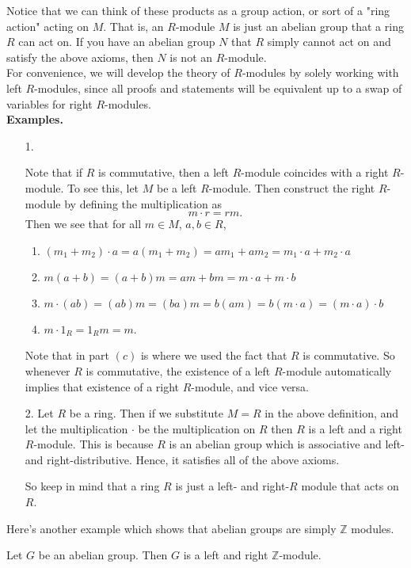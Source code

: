 \documentclass[12pt,letterpaper]{algebra_book}
\newcommand{\ZZ}{\mathbb{Z}}
\theoremstyle{definition}
\begin{document}
Notice that we can think of these products as a group action, or sort of a
"ring action" acting on $M$. That is, an $R$-module $M$ is just an abelian
group that a ring $R$ can act on. If you have an abelian group $N$
that $R$ simply cannot act on and satisfy the above axioms, then
$N$ is not an $R$-module.
\\
For convenience, we will develop the theory of $R$-modules by
solely working with left $R$-modules, since all proofs and
statements will be equivalent up to a swap of variables for right
$R$-modules. 
\\
\textbf{Examples.}\\
\begin{itemize}
    \item[1.] \textcolor{NavyBlue}{Note that if $R$ is commutative, then a left
    $R$-module coincides with a right $R$-module. To see this, let $M$
    be a left $R$-module. Then construct the right $R$-module by
    defining the multiplication as
    \[
        m\cdot r = rm.
    \]
    Then we see that for all $m \in M$, $a,b \in R$, 
    \begin{enumerate}
        \item $(m_1 + m_2)\cdot a = a(m_1 + m_2) = am_1 + am_2 = m_1
        \cdot a + m_2 \cdot a$ \checkmark
        \item $m(a + b)= (a + b)m = am + bm = m \cdot a + m
        \cdot b$ \checkmark 
        \item $m\cdot (a b) = (ab)m = (ba)m = b(am) = b(m \cdot a) = (m
        \cdot a )\cdot b$ \checkmark 
        \item $m \cdot 1_R = 1_Rm = m$. \checkmark
    \end{enumerate}
    Note that in part $(c)$ is where we used the fact that $R$ is
    commutative. So whenever $R$ is commutative, the existence of a
    left $R$-module automatically implies that existence of a
    right $R$-module, and vice versa.
    }

    \item[2.] Let $R$ be a ring. Then if we substitute $M =R$ in the above
    definition, and let the multiplication $
    \cdot$ be the multiplication on $R$ then $R$ is a left and a right
    $R$-module. This is because $R$ is an abelian group which is
    associative and left- and right-distributive. Hence, it satisfies
    all of the above axioms. 

    So keep in mind that a ring $R$ is just a left- and right-$R$
    module that acts on $R$. 

\end{itemize}
Here's another example which shows that abelian groups are simply
$\ZZ$ modules. 
\begin{proposition}
    Let $G$ be an abelian group. Then $G$ is a left and right
    $\ZZ$-module. 
\end{proposition}
\end{document}
